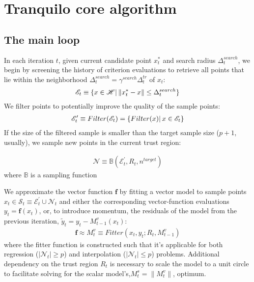 \section{Tranquilo core algorithm}


\subsection{The main loop}
In each iteration $t$, given current candidate point $x^*_t$ and search radius $\Delta^{search}_t$, we begin by screening the history of criterion evaluations to retrieve all points that lie within the neighborhood $\Delta^{search}_t=\gamma^{search}\Delta_t^{tr}$ of $x_t$:
\begin{align}
    \mathscr{E}_t\equiv\{x\in\mathscr{H}|\hspace{0.2em}\lVert x^*_t-x\rVert\leq\Delta^{search}_t\}
    \label{eq:hist-search}
\end{align}
We filter points to potentially improve the quality of the sample points:
\begin{align}
    \mathscr{E}'_t\equiv Filter (\mathscr{E}_t) = \{ Filter (x)|\hspace{0.2em} x\in \mathscr{E}_t\}
    \label{eq:filtering}
\end{align}
If the size of the filtered sample is smaller than the target sample size ($p+1$, usually), we sample new points in the current trust region:

\begin{align}
    \mathcal{N}\equiv\mathbb{B}(\mathcal{E}_t^{'},R_t,n^{target})
\end{align}
where $\mathbb{B}$ is a sampling function

We approximate the vector function $\mathbf{f}$ by fitting a vector model to sample points $x_t\in\mathcal{S}_t\equiv\mathcal{E}^{'}_t\cup\mathcal{N}_t$ and either the corresponding vector-function evaluations $y_t=\mathbf{f}(x_t)$, or, to introduce momentum, the residuals of the model from the previous iteration, $\tilde{y}_t =y_t-M_{t-1}^v(x_t)$:
\begin{align}
    \mathbf{f}\approx M_t^v\equiv Fitter(x_t,y_t;R_t,M_{t-1}^v)
\end{align}
where the fitter function is constructed such that it's applicable for both regression ($|\mathcal{N}_t|\geq p$) and interpolation ($|\mathcal{N}_t|\leq p$) problems. Additional dependency on the trust region $R_t$ is necessary to scale the model to a unit circle to facilitate solving for the scalar model's,$M_t^s = \lVert M_t^v\rVert$, optimum.

